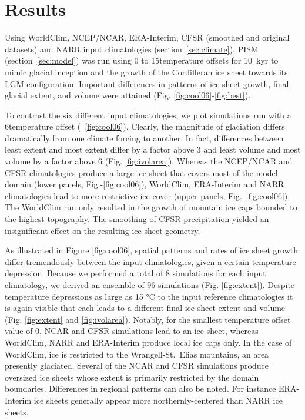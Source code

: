 \section{Results}
\label{sec:results}

Using WorldClim, NCEP/NCAR, ERA-Interim, CFSR (smoothed and original datasets) and NARR input climatologies (section~\ref{sec:climate}), PISM (section~\ref{sec:model}) was run using 0 to 15\degC  temperature offsets for 10~kyr to mimic glacial inception and the growth of the Cordilleran ice sheet towards its LGM configuration. Important differences in patterns of ice sheet growth, final glacial extent, and volume were attained (Fig. \ref{fig:cool06}-\ref{fig:best}).

To contrast the six different input climatologies, we plot simulations run with a 6\degC temperature offset (~\ref{fig:cool06}). Clearly, the magnitude of glaciation differs dramatically from one climate forcing to another. In fact, differences between least extent and most extent differ by a factor above 3 and least volume and most volume by a factor above 6 (Fig. \ref{fig:ivolarea}). Whereas the NCEP/NCAR and CFSR climatologies produce a large ice sheet that covers most of the model domain (lower panels, Fig.-\ref{fig:cool06}), WorldClim, ERA-Interim and NARR climatologies lead to more restrictive ice cover (upper panels, Fig.~\ref{fig:cool06}). The WorldClim run only resulted in the growth of mountain ice caps bounded to the highest topography. The smoothing of CFSR precipitation yielded an insignificant effect on the resulting ice sheet geometry.

As illustrated in Figure \ref{fig:cool06}, spatial patterns and rates of ice sheet growth differ tremendously between the input climatologies, given a certain temperature depression. Because we performed a total of 8 simulations for each input climatology, we derived an ensemble of 96 simulations (Fig. \ref{fig:extent}). Despite temperature depressions as large as 15 °C to the input reference climatologies it is again visible that each leads to a different final ice sheet extent and volume (Fig. \ref{fig:extent} and \ref{fig:ivolarea}). Notably, for the smallest temperature offset value of 0\degC, NCAR and CFSR simulations lead to an ice-sheet, whereas WorldClim, NARR and ERA-Interim produce local ice caps only. In the case of WorldClim, ice is restricted to the Wrangell-St.~Elias mountains, an area presently glaciated. Several of the NCAR and CFSR simulations produce oversized ice sheets whose extent is primarily restricted by the domain boundaries. Differences in regional patterns can also be noted. For instance ERA-Interim ice sheets generally appear more northernly-centered than NARR ice sheets.

